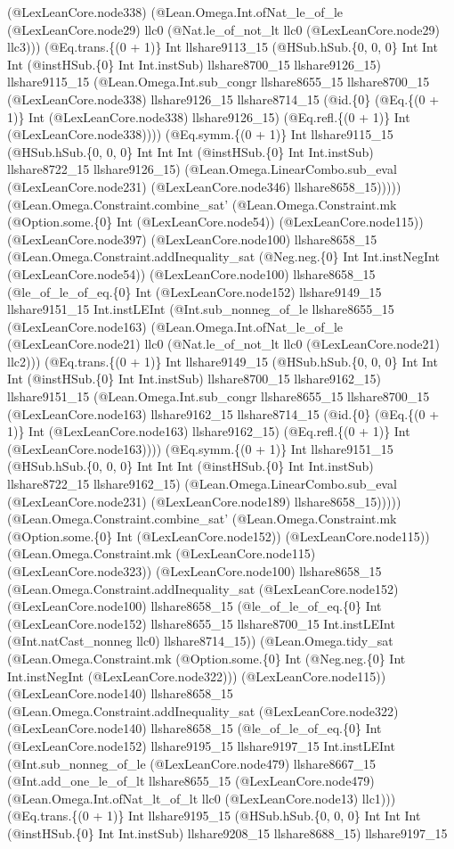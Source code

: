 \documentclass[11pt]{article}
\begin{document}
(@LexLeanCore.node338) (@Lean.Omega.Int.ofNat\_le\_of\_le (@LexLeanCore.node29) llc0 (@Nat.le\_of\_not\_lt llc0 (@LexLeanCore.node29) llc3))) (@Eq.trans.\{(0 + 1)\} Int llshare9113\_15 (@HSub.hSub.\{0, 0, 0\} Int Int Int (@instHSub.\{0\} Int Int.instSub) llshare8700\_15 llshare9126\_15) llshare9115\_15 (@Lean.Omega.Int.sub\_congr llshare8655\_15 llshare8700\_15 (@LexLeanCore.node338) llshare9126\_15 llshare8714\_15 (@id.\{0\} (@Eq.\{(0 + 1)\} Int (@LexLeanCore.node338) llshare9126\_15) (@Eq.refl.\{(0 + 1)\} Int (@LexLeanCore.node338)))) (@Eq.symm.\{(0 + 1)\} Int llshare9115\_15 (@HSub.hSub.\{0, 0, 0\} Int Int Int (@instHSub.\{0\} Int Int.instSub) llshare8722\_15 llshare9126\_15) (@Lean.Omega.LinearCombo.sub\_eval (@LexLeanCore.node231) (@LexLeanCore.node346) llshare8658\_15))))) (@Lean.Omega.Constraint.combine\_sat' (@Lean.Omega.Constraint.mk (@Option.some.\{0\} Int (@LexLeanCore.node54)) (@LexLeanCore.node115)) (@LexLeanCore.node397) (@LexLeanCore.node100) llshare8658\_15 (@Lean.Omega.Constraint.addInequality\_sat (@Neg.neg.\{0\} Int Int.instNegInt (@LexLeanCore.node54)) (@LexLeanCore.node100) llshare8658\_15 (@le\_of\_le\_of\_eq.\{0\} Int (@LexLeanCore.node152) llshare9149\_15 llshare9151\_15 Int.instLEInt (@Int.sub\_nonneg\_of\_le llshare8655\_15 (@LexLeanCore.node163) (@Lean.Omega.Int.ofNat\_le\_of\_le (@LexLeanCore.node21) llc0 (@Nat.le\_of\_not\_lt llc0 (@LexLeanCore.node21) llc2))) (@Eq.trans.\{(0 + 1)\} Int llshare9149\_15 (@HSub.hSub.\{0, 0, 0\} Int Int Int (@instHSub.\{0\} Int Int.instSub) llshare8700\_15 llshare9162\_15) llshare9151\_15 (@Lean.Omega.Int.sub\_congr llshare8655\_15 llshare8700\_15 (@LexLeanCore.node163) llshare9162\_15 llshare8714\_15 (@id.\{0\} (@Eq.\{(0 + 1)\} Int (@LexLeanCore.node163) llshare9162\_15) (@Eq.refl.\{(0 + 1)\} Int (@LexLeanCore.node163)))) (@Eq.symm.\{(0 + 1)\} Int llshare9151\_15 (@HSub.hSub.\{0, 0, 0\} Int Int Int (@instHSub.\{0\} Int Int.instSub) llshare8722\_15 llshare9162\_15) (@Lean.Omega.LinearCombo.sub\_eval (@LexLeanCore.node231) (@LexLeanCore.node189) llshare8658\_15))))) (@Lean.Omega.Constraint.combine\_sat' (@Lean.Omega.Constraint.mk (@Option.some.\{0\} Int (@LexLeanCore.node152)) (@LexLeanCore.node115)) (@Lean.Omega.Constraint.mk (@LexLeanCore.node115) (@LexLeanCore.node323)) (@LexLeanCore.node100) llshare8658\_15 (@Lean.Omega.Constraint.addInequality\_sat (@LexLeanCore.node152) (@LexLeanCore.node100) llshare8658\_15 (@le\_of\_le\_of\_eq.\{0\} Int (@LexLeanCore.node152) llshare8655\_15 llshare8700\_15 Int.instLEInt (@Int.natCast\_nonneg llc0) llshare8714\_15)) (@Lean.Omega.tidy\_sat (@Lean.Omega.Constraint.mk (@Option.some.\{0\} Int (@Neg.neg.\{0\} Int Int.instNegInt (@LexLeanCore.node322))) (@LexLeanCore.node115)) (@LexLeanCore.node140) llshare8658\_15 (@Lean.Omega.Constraint.addInequality\_sat (@LexLeanCore.node322) (@LexLeanCore.node140) llshare8658\_15 (@le\_of\_le\_of\_eq.\{0\} Int (@LexLeanCore.node152) llshare9195\_15 llshare9197\_15 Int.instLEInt (@Int.sub\_nonneg\_of\_le (@LexLeanCore.node479) llshare8667\_15 (@Int.add\_one\_le\_of\_lt llshare8655\_15 (@LexLeanCore.node479) (@Lean.Omega.Int.ofNat\_lt\_of\_lt llc0 (@LexLeanCore.node13) llc1))) (@Eq.trans.\{(0 + 1)\} Int llshare9195\_15 (@HSub.hSub.\{0, 0, 0\} Int Int Int (@instHSub.\{0\} Int Int.instSub) llshare9208\_15 llshare8688\_15) llshare9197\_15 
\end{document}
